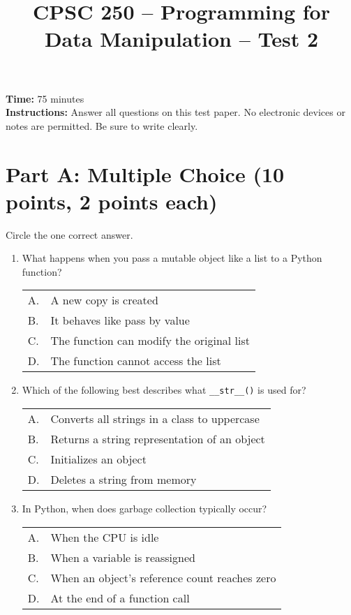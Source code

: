 \documentclass[11pt]{article}
\title{\vspace{-1cm}CPSC 250 – Programming for Data Manipulation – Test 2}
\date{}
\begin{document}
\maketitle

\noindent\textbf{Time:} 75 minutes \\
\textbf{Instructions:} Answer all questions on this test paper. No electronic devices or notes are permitted. Be sure to write clearly.

\vspace{0.5cm}
\section*{Part A: Multiple Choice (10 points, 2 points each)}
\noindent Circle the one correct answer.

\begin{enumerate}[label=\arabic*.]
    \item What happens when you pass a mutable object like a list to a Python function? \\
    \begin{tabular}{ll}
        A. & A new copy is created \\
        B. & It behaves like pass by value \\
        C. & The function can modify the original list \\
        D. & The function cannot access the list
    \end{tabular}

    \item Which of the following best describes what \verb|__str__()| is used for? \\
    \begin{tabular}{ll}
        A. & Converts all strings in a class to uppercase \\
        B. & Returns a string representation of an object \\
        C. & Initializes an object \\
        D. & Deletes a string from memory
    \end{tabular}

    \item In Python, when does garbage collection typically occur? \\
    \begin{tabular}{ll}
        A. & When the CPU is idle \\
        B. & When a variable is reassigned \\
        C. & When an object's reference count reaches zero \\
        D. & At the end of a function call
    \end{tabular}


\end{enumerate}
\end{document}
